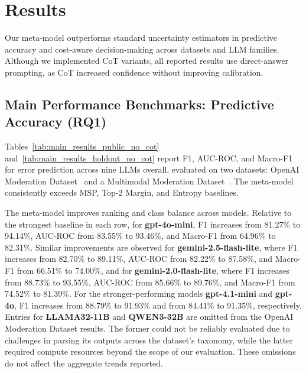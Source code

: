 \section{Results}
\label{sec:results}
Our meta-model outperforms standard uncertainty estimators in predictive accuracy and cost-aware decision-making across datasets and LLM families. Although we implemented CoT variants, all reported results use direct-answer prompting, as CoT increased confidence without improving calibration.
\subsection{Main Performance Benchmarks: Predictive Accuracy (RQ1)}
\label{subsec:predictive_performance}
Tables~\ref{tab:main_results_public_no_cot} and~\ref{tab:main_results_holdout_no_cot} report F1, AUC-ROC, and Macro-F1 for error prediction across nine LLMs overall, evaluated on two datasets: OpenAI Moderation Dataset~\cite{markov2023holisticapproachundesiredcontent} and a Multimodal Moderation Dataset~\cite{levi+al:25}. The meta-model consistently exceeds MSP, Top-2 Margin, and Entropy baselines.



The meta-model improves ranking and class balance across models. Relative to the strongest baseline in each row, for \textbf{gpt-4o-mini}, F1 increases from 81.27\% to 94.14\%, AUC-ROC from 83.55\% to 93.46\%, and Macro-F1 from 64.96\% to 82.31\%. Similar improvements are observed for \textbf{gemini-2.5-flash-lite}, where F1 increases from 82.70\% to 89.11\%, AUC-ROC from 82.22\% to 87.58\%, and Macro-F1 from 66.51\% to 74.00\%, and for \textbf{gemini-2.0-flash-lite}, where F1 increases from 88.73\% to 93.55\%, AUC-ROC from 85.66\% to 89.76\%, and Macro-F1 from 74.52\% to 81.39\%. For the stronger-performing models \textbf{gpt-4.1-mini} and \textbf{gpt-4o}, F1 increases from 88.79\% to 91.93\% and from 84.41\% to 91.35\%, respectively. Entries for \textbf{LLAMA32-11B} and \textbf{QWEN3-32B} are omitted from the OpenAI Moderation Dataset results. The former could not be reliably evaluated due to challenges in parsing its outputs across the dataset’s taxonomy, while the latter required compute resources beyond the scope of our evaluation. These omissions do not affect the aggregate trends reported.

